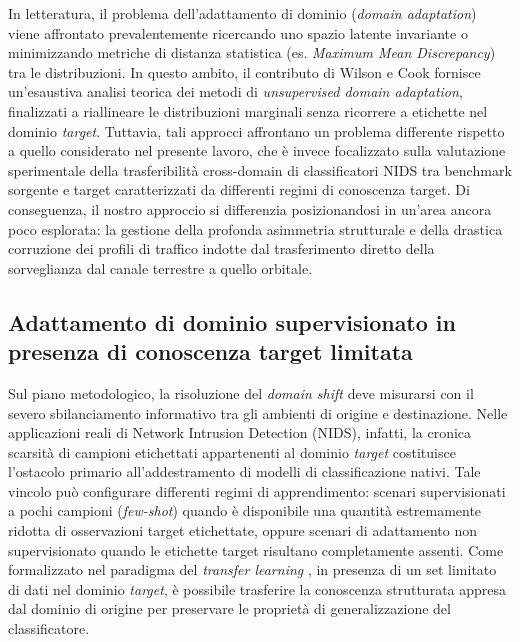 In letteratura, il problema dell'adattamento di dominio (\textit{domain adaptation}) viene affrontato prevalentemente ricercando uno spazio latente invariante o minimizzando metriche di distanza statistica (es. \textit{Maximum Mean Discrepancy}) tra le distribuzioni. 
In questo ambito, il contributo di Wilson e Cook \cite{wilson2020} fornisce un'esaustiva analisi teorica dei metodi di \textit{unsupervised domain adaptation}, finalizzati a riallineare le distribuzioni marginali senza ricorrere a etichette nel dominio \textit{target}. 
Tuttavia, tali approcci affrontano un problema differente rispetto a quello considerato nel presente lavoro, che è invece focalizzato sulla valutazione sperimentale della trasferibilità cross-domain di classificatori NIDS tra benchmark sorgente e target caratterizzati da differenti regimi di conoscenza target.
Di conseguenza, il nostro approccio si differenzia posizionandosi in un'area ancora poco esplorata: la gestione della profonda asimmetria strutturale e della drastica corruzione dei profili di traffico indotte dal trasferimento diretto della sorveglianza dal canale terrestre a quello orbitale.

\subsection{Adattamento di dominio supervisionato in presenza di conoscenza target limitata}
\label{subsec:supervised_da_nids}

Sul piano metodologico, la risoluzione del \textit{domain shift} deve misurarsi con il severo sbilanciamento informativo tra gli ambienti di origine e destinazione. 
Nelle applicazioni reali di Network Intrusion Detection (NIDS), infatti, la cronica scarsità di campioni etichettati appartenenti al dominio \textit{target} costituisce l'ostacolo primario all'addestramento di modelli di classificazione nativi. 
Tale vincolo può configurare differenti regimi di apprendimento: scenari supervisionati a pochi campioni (\textit{few-shot}) quando è disponibile una quantità estremamente ridotta di osservazioni target etichettate, oppure scenari di adattamento non supervisionato quando le etichette target risultano completamente assenti.
Come formalizzato nel paradigma del \textit{transfer learning} \cite{pan2010}, in presenza di un set limitato di dati nel dominio \textit{target}, è possibile trasferire la conoscenza strutturata appresa dal dominio di origine per preservare le proprietà di generalizzazione del classificatore.

